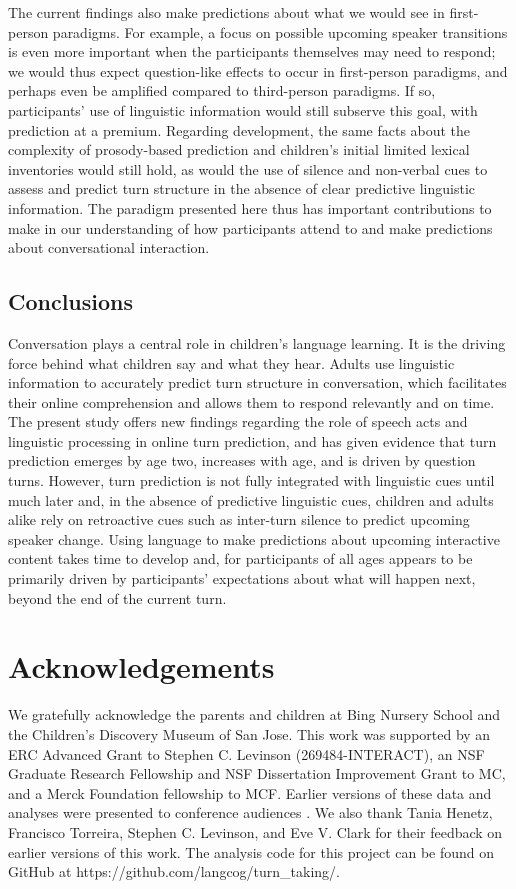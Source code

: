 \documentclass[authoryear, 12pt]{elsarticle}
\begin{document}
The current findings also make predictions about what we would see in first-person paradigms. For example, a focus on possible upcoming speaker transitions is even more important when the participants themselves may need to respond; we would thus expect question-like effects to occur in first-person paradigms, and perhaps even be amplified compared to third-person paradigms. If so, participants' use of linguistic information would still subserve this goal, with prediction at a premium. Regarding development, the same facts about the complexity of prosody-based prediction and children's initial limited lexical inventories would still hold, as would the use of silence and non-verbal cues to assess and predict turn structure in the absence of clear predictive linguistic information. The paradigm presented here thus has important contributions to make in our understanding of how participants attend to and make predictions about conversational interaction.


\subsection*{Conclusions}

Conversation plays a central role in children's language learning. It is the driving force behind what children say and what they hear. Adults use linguistic information to accurately predict turn structure in conversation, which facilitates their online comprehension and allows them to respond relevantly and on time. The present study offers new findings regarding the role of speech acts and linguistic processing in online turn prediction, and has given evidence that turn prediction emerges by age two, increases with age, and is driven by question turns. However, turn prediction is not fully integrated with linguistic cues until much later and, in the absence of predictive linguistic cues, children and adults alike rely on retroactive cues such as inter-turn silence to predict upcoming speaker change. Using language to make predictions about upcoming interactive content takes time to develop and, for participants of all ages appears to be primarily driven by participants' expectations about what will happen next, beyond the end of the current turn.

\section*{Acknowledgements}

We gratefully acknowledge the parents and children at Bing Nursery School and the Children's Discovery Museum of San Jose. This work was supported by an ERC Advanced Grant to Stephen C. Levinson (269484-INTERACT), an NSF Graduate Research Fellowship and NSF Dissertation Improvement Grant to MC, and a Merck Foundation fellowship to MCF. Earlier versions of these data and analyses were presented to conference audiences \citep{casillas2012, casillas2013}. We also thank Tania Henetz, Francisco Torreira, Stephen C. Levinson, and Eve V. Clark for their feedback on earlier versions of this work. The analysis code for this project can be found on GitHub at https://github.com/langcog/turn\_taking/.
\end{document}
